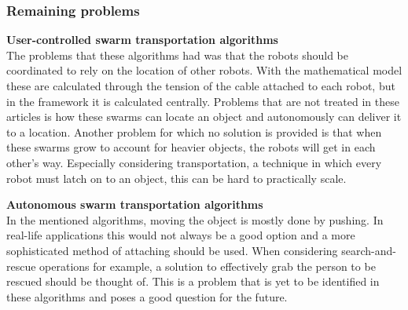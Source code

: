\subsubsection{Remaining problems}

\textbf{User-controlled swarm transportation algorithms}\\
The problems that these algorithms had was that the robots should be coordinated to rely on the location of other robots.
With the mathematical model these are calculated through the tension of the cable attached to each robot, but in the framework it is calculated centrally. 
Problems that are not treated in these articles is how these swarms can locate an object and autonomously can deliver it to a location. 
Another problem for which no solution is provided is that when these swarms grow to account for heavier objects, the robots will get in each other's way. 
Especially considering transportation, a technique in which every robot must latch on to an object, this can be hard to practically scale. 

\textbf{Autonomous swarm transportation algorithms}\\
In the mentioned algorithms, moving the object is mostly done by pushing. In real-life applications this would not always be a good option and a more sophisticated method of attaching should be used. When considering search-and-rescue operations for example, a solution to effectively grab the person to be rescued should be thought of. This is a problem that is yet to be identified in these algorithms and poses a good question for the future.